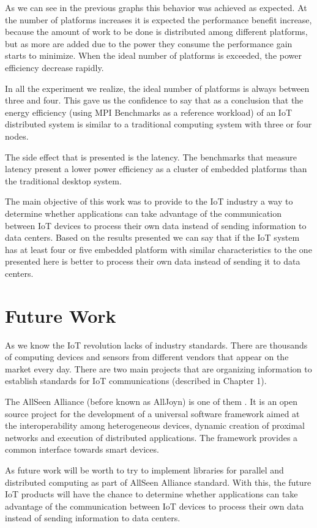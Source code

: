 As we can see in the previous graphs this behavior was achieved as expected. At
the number of platforms increases it is expected the performance benefit
increase, because the amount of work to be done is distributed among different
platforms, but as more are added due to the power they consume the performance
gain starts to minimize. When the ideal number of platforms is exceeded, the
power efficiency decrease rapidly.

In all the experiment we realize, the ideal number of platforms is always
between three and four. This gave us the confidence to say that as a conclusion
that the energy efficiency (using MPI Benchmarks as a reference workload) of an
IoT distributed system is similar to a traditional computing system \cite{NUC}
with three or four nodes.

The side effect that is presented is the latency. The benchmarks that measure
latency present a lower power efficiency as a cluster of embedded platforms
than the traditional desktop system. 

The main objective of this work was to provide to the IoT industry a way to
determine whether applications can take advantage of the communication between
IoT devices to process their own data instead of sending information to data
centers. Based on the results presented we can say that if the IoT system has
at least four or five embedded platform with similar characteristics to the one
presented here \cite{minnowboard} is better to process their own data instead
of sending it to data centers.

\section{Future Work}
\noindent

As we know the IoT revolution lacks of industry standards. There are thousands
of computing devices and sensors from different vendors that appear on the
market every day. There are two main projects that are organizing information
to establish standards for IoT communications (described in Chapter 1).

The AllSeen Alliance (before known as AllJoyn) is one of them . It is an open
source project for the development of a universal software framework aimed at
the interoperability among heterogeneous devices, dynamic creation of proximal
networks and execution of distributed applications. The framework provides a
common interface towards smart devices.

As future work will be worth to try to implement libraries for parallel and
distributed computing as part of AllSeen Alliance standard. With this, the
future IoT products will have the chance to determine whether applications can
take advantage of the communication between IoT devices to process their own
data instead of sending information to data centers. 

\clearpage
